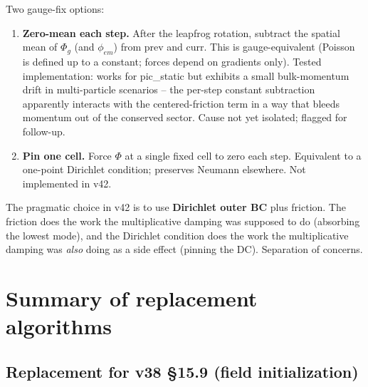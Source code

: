 \documentclass[11pt,a4paper]{article}
\newcommand{\Phig}{\Phi_g}
\begin{document}
Two gauge-fix options:
\begin{enumerate}[leftmargin=*,nosep]
\item \textbf{Zero-mean each step.}  After the leapfrog rotation,
  subtract the spatial mean of $\Phig$ (and $\phi_{em}$) from prev and
  curr.  This is gauge-equivalent (Poisson is defined up to a
  constant; forces depend on gradients only).  Tested implementation:
  works for pic\_static but exhibits a small bulk-momentum drift in
  multi-particle scenarios -- the per-step constant subtraction
  apparently interacts with the centered-friction term in a way
  that bleeds momentum out of the conserved sector.  Cause not yet
  isolated; flagged for follow-up.
\item \textbf{Pin one cell.}  Force $\Phi$ at a single fixed cell to
  zero each step.  Equivalent to a one-point Dirichlet condition;
  preserves Neumann elsewhere.  Not implemented in v42.
\end{enumerate}
The pragmatic choice in v42 is to use \textbf{Dirichlet outer BC}
plus friction.  The friction does the work the multiplicative
damping was supposed to do (absorbing the lowest mode), and the
Dirichlet condition does the work the multiplicative damping was
\emph{also} doing as a side effect (pinning the DC).  Separation of
concerns.

\section{Summary of replacement algorithms}

\subsection*{Replacement for v38 \S 15.9 (field initialization)}
\end{document}
